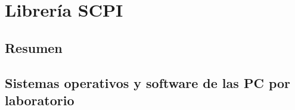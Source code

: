 \chapter[Librería SCPI]{Librería SCPI}
\label{cp:LibSCPI}

\section*{Resumen}

\section{Sistemas operativos y software de las PC por laboratorio}
